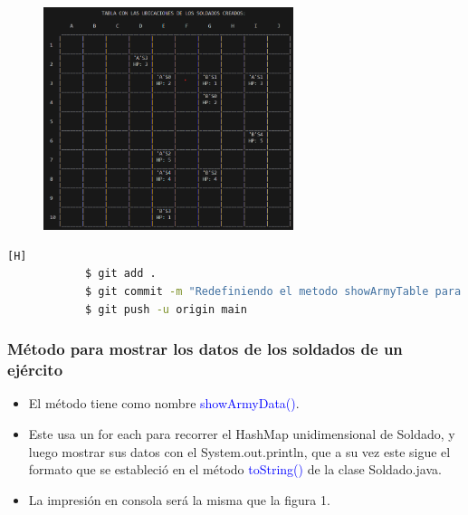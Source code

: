 \documentclass{article}
\begin{document}
        \begin{figure}[H]
            \centering
            \includegraphics[width=0.65\textwidth,keepaspectratio]{img/showArmyTable.png}
            \caption{}
        \end{figure}

        \begin{lstlisting}[language=bash,caption={Commit \href{https://github.com/hernanchoquehuanca/fp2-23b/commit/7bfe7cc6bb3d6b25f4d3794ddb84aee53d21d7d0}{7bfe7cc}: Se adaptó e implementó el método para mostrar la tabla con los soldados de ambos ejércitos incluyendo su vida}][H]
    		$ git add .
    		$ git commit -m "Redefiniendo el metodo showArmyTable para ahora trabajar con HashMap, simplemente se adaptaron los metodos para acceder a los soldados y los limites de interaciones en cada for"
    		$ git push -u origin main
    	\end{lstlisting}
        
        
        \subsubsection{Método para mostrar los datos de los soldados de un ejército}

        \begin{itemize}
            \item El método tiene como nombre \textcolor{blue}{showArmyData()}.
            \item Este usa un for each para recorrer el HashMap unidimensional de Soldado, y luego mostrar sus datos con el System.out.println, que a su vez este sigue el formato que se estableció en el método \textcolor{blue}{toString()} de la clase Soldado.java.
            \item La impresión en consola será la misma que la figura 1.
        \end{itemize}
\end{document}
